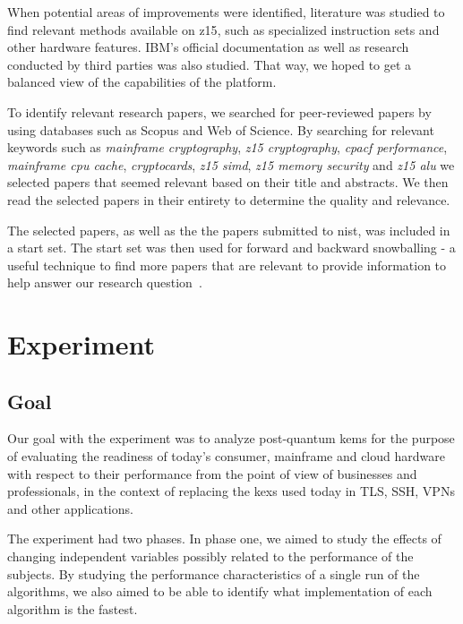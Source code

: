 When potential areas of improvements were identified, literature was studied to find relevant methods available on \gls{z15}, such as specialized instruction sets and other hardware features. IBM's official documentation as well as research conducted by third parties was also studied. That way, we hoped to get a balanced view of the capabilities of the platform.

To identify relevant research papers, we searched for peer-reviewed papers by using databases such as Scopus and Web of Science. By searching for relevant keywords such as \textit{mainframe cryptography}, \textit{z15 cryptography}, \textit{cpacf performance}, \textit{mainframe cpu cache}, \textit{cryptocards}, \textit{z15 simd}, \textit{z15 memory security} and \textit{z15 alu} we selected papers that seemed relevant based on their title and abstracts. We then read the selected papers in their entirety to determine the quality and relevance.

The selected papers, as well as the the papers submitted to \gls{nist}, was included in a start set. The start set was then used for forward and backward snowballing - a useful technique to find more papers that are relevant to provide information to help answer our research question~\cite{wohlin2014}.

\section{Experiment}
\label{section:method:experiment}

\subsection{Goal}
\label{section:method:experiment:goal}

Our goal with the experiment was to analyze \gls{post-quantum} \glspl{kem} for the purpose of evaluating the readiness of today's consumer, mainframe and cloud hardware with respect to their performance from the point of view of businesses and professionals, in the context of replacing the \glspl{kex} used today in TLS, SSH, VPNs and other applications.

The experiment had two phases. In phase one, we aimed to study the effects of changing independent variables possibly related to the performance of the subjects. By studying the performance characteristics of a single run of the algorithms, we also aimed to be able to identify what implementation of each algorithm is the fastest.

